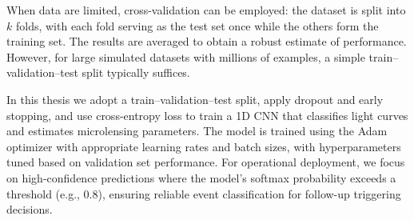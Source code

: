 When data are limited, cross-validation can be employed: the dataset is split into $k$ folds, with each fold serving as the test set once while the others form the training set. The results are averaged to obtain a robust estimate of performance. However, for large simulated datasets with millions of examples, a simple train–validation–test split typically suffices.

In this thesis we adopt a train–validation–test split, apply dropout and early stopping, and use cross-entropy loss to train a 1D CNN that classifies light curves and estimates microlensing parameters. The model is trained using the Adam optimizer with appropriate learning rates and batch sizes, with hyperparameters tuned based on validation set performance. For operational deployment, we focus on high-confidence predictions where the model's softmax probability exceeds a threshold (e.g., 0.8), ensuring reliable event classification for follow-up triggering decisions.